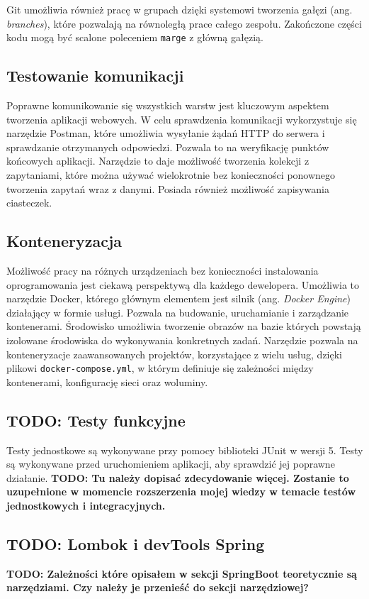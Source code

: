 Git umożliwia również pracę w grupach dzięki systemowi tworzenia gałęzi (ang. \textit{branches}), które pozwalają na równoległą prace całego zespołu. Zakończone części kodu mogą być scalone poleceniem \texttt{marge} z główną gałęzią.
\subsection*{Testowanie komunikacji}
Poprawne komunikowanie się wszystkich warstw jest kluczowym aspektem tworzenia aplikacji webowych. W celu sprawdzenia komunikacji wykorzystuje się narzędzie Postman, które umożliwia wysyłanie żądań HTTP do serwera i sprawdzanie otrzymanych odpowiedzi. Pozwala to na weryfikację punktów końcowych aplikacji. Narzędzie to daje możliwość tworzenia kolekcji z zapytaniami, które można używać wielokrotnie bez konieczności ponownego tworzenia zapytań wraz z danymi. Posiada również możliwość zapisywania ciasteczek.

\subsection*{Konteneryzacja}
Możliwość pracy na różnych urządzeniach bez konieczności instalowania oprogramowania jest ciekawą perspektywą dla każdego dewelopera. Umożliwia to narzędzie Docker, którego głównym elementem jest silnik (ang. \textit{Docker Engine}) działający w formie usługi. Pozwala na budowanie, uruchamianie i zarządzanie kontenerami. Środowisko umożliwia tworzenie obrazów na bazie których powstają izolowane środowiska do wykonywania konkretnych zadań. Narzędzie pozwala na konteneryzacje zaawansowanych projektów, korzystające z wielu usług, dzięki plikowi \texttt{docker-compose.yml}, w którym definiuje się zależności między kontenerami, konfigurację sieci oraz woluminy.

\subsection*{TODO: Testy funkcyjne}
Testy jednostkowe są wykonywane przy pomocy biblioteki JUnit w wersji 5. Testy są wykonywane przed uruchomieniem aplikacji, aby sprawdzić jej poprawne działanie. 
\textbf{TODO: Tu należy dopisać zdecydowanie więcej. Zostanie to uzupełnione w momencie rozszerzenia mojej wiedzy w temacie testów jednostkowych i integracyjnych.}
\subsection*{TODO: Lombok i devTools Spring}
\textbf{TODO: Zależności które opisałem w sekcji SpringBoot teoretycznie są narzędziami. Czy należy je przenieść do sekcji narzędziowej?}
